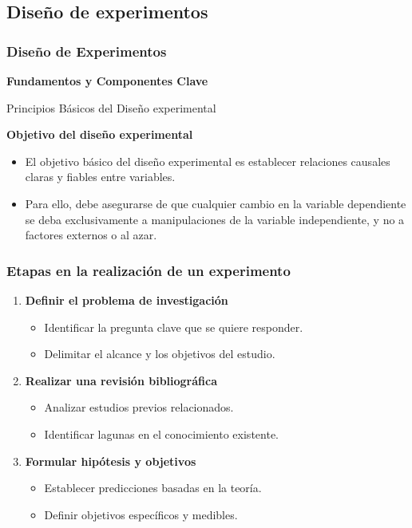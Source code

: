 ﻿\documentclass{beamer}
\begin{document}
\subsection{Diseño de experimentos}
\begin{frame}
    \frametitle{Diseño de Experimentos}
    \centering
    \textbf{\Large Fundamentos y Componentes Clave}
    \vspace{0.5cm}
\end{frame}

\begin{frame}{Principios Básicos del Diseño experimental}

\textbf{Objetivo del diseño experimental}
\begin{itemize}
    \item El objetivo básico del diseño experimental es establecer relaciones causales claras y fiables entre variables.
    \item Para ello, debe asegurarse de que cualquier cambio en la variable dependiente se deba exclusivamente a manipulaciones de la variable independiente, y no a factores externos o al azar.
\end{itemize}

\end{frame}

\begin{frame}
\frametitle{Etapas en la realización de un experimento}
\begin{enumerate}
    \item \textbf{Definir el problema de investigación}
    \begin{itemize}
        \item Identificar la pregunta clave que se quiere responder.
        \item Delimitar el alcance y los objetivos del estudio.
    \end{itemize}
    \vspace{0.3cm}
    \item \textbf{Realizar una revisión bibliográfica}
    \begin{itemize}
        \item Analizar estudios previos relacionados.
        \item Identificar lagunas en el conocimiento existente.
    \end{itemize}
    \vspace{0.3cm}
    \item \textbf{Formular hipótesis y objetivos}
    \begin{itemize}
        \item Establecer predicciones basadas en la teoría.
        \item Definir objetivos específicos y medibles.
    \end{itemize}
\end{enumerate}
\end{frame}
\end{document}
